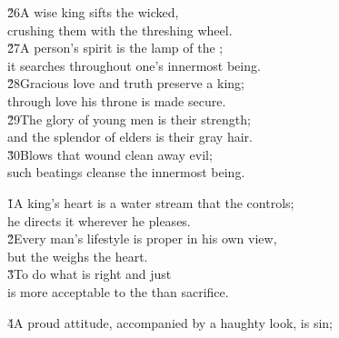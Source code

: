 \begin{poetry}
\poeml \v{26}A wise king sifts the wicked, \\
\poemll    crushing them with the threshing wheel. \\
\poeml \v{27}A person's spirit is the lamp of the ; \\
\poemll    it searches throughout one's innermost being. \\
\poeml \v{28}Gracious love and truth preserve a king; \\
\poemll    through love his throne is made secure. \\
\poeml \v{29}The glory of young men is their strength; \\
\poemll    and the splendor of elders is their gray hair. \\
\poeml \v{30}Blows that wound clean away evil; \\
\poemll    such beatings cleanse the innermost being.
\end{poetry}

\begin{poetry}
\poeml {}
\v{1}A king's heart is a water stream that the  controls; \\
\poeml he directs it wherever he pleases. \\
\poeml \v{2}Every man's lifestyle is proper in his own view, \\
\poemll    but the  weighs the heart. \\
\poeml \v{3}To do what is right and just \\
\poemll    is more acceptable to the  than sacrifice.
\end{poetry}

\v{4}A proud attitude, accompanied by a haughty look, is sin;

